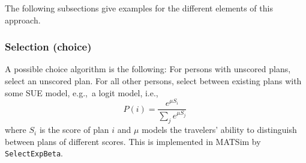 The following subsections give examples for the different elements of
this approach.


\subsubsection{Selection (choice)}
\label{sec:ag-based-assignment-selection}

A possible choice algorithm is the following: For persons with
unscored plans, select an unscored plan.  For all other persons,
select between existing plans with some SUE model, e.g.,\ a logit
model, i.e.,
\begin{equation}
P(i) = \frac{e^{\mu S_i}}{\sum_j e^{\mu S_j}} \
\label{eq:2}
\end{equation}
where $S_i$ is the score of plan $i$ and $\mu$ models the
travelers' ability to distinguish between plans of different
scores.
%
This is implemented in MATSim by \lstinline{SelectExpBeta}.

